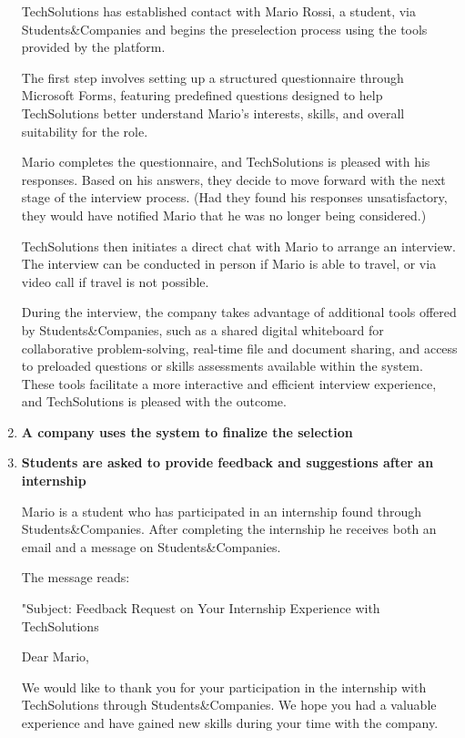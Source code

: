 \begin{enumerate}
    TechSolutions has established contact with Mario Rossi, a student, via Students\&Companies and begins the preselection process using the tools provided by the platform.

    The first step involves setting up a structured questionnaire through Microsoft Forms, featuring predefined questions designed to help TechSolutions better understand Mario’s interests, skills, and overall suitability for the role.

    Mario completes the questionnaire, and TechSolutions is pleased with his responses. Based on his answers, they decide to move forward with the next stage of the interview process. (Had they found his responses unsatisfactory, they would have notified Mario that he was no longer being considered.)

    TechSolutions then initiates a direct chat with Mario to arrange an interview. The interview can be conducted in person if Mario is able to travel, or via video call if travel is not possible.

    During the interview, the company takes advantage of additional tools offered by Students\&Companies, such as a shared digital whiteboard for collaborative problem-solving, real-time file and document sharing, and access to preloaded questions or skills assessments available within the system. These tools facilitate a more interactive and efficient interview experience, and TechSolutions is pleased with the outcome.

    \item \textbf{A company uses the system to finalize the selection}

    \item \textbf{Students are asked to provide feedback and suggestions after an internship}

    Mario is a student who has participated in an internship found through Students\&Companies. After completing the internship he receives both an email and a message on Students\&Companies.

    The message reads:

    "Subject: Feedback Request on Your Internship Experience with TechSolutions

    Dear Mario,

    We would like to thank you for your participation in the internship with TechSolutions through Students\&Companies. We hope you had a valuable experience and have gained new skills during your time with the company.


\end{enumerate}
